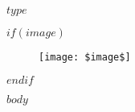 \documentclass{article}
\begin{document}
  \begin{flushright}
    {$type$}
  \end{flushright}
  $if(image)$
  \begin{figure}[H]
      \centering
      \texttt{[image: \$image\$]}
  \end{figure}
  $endif$
  \begin{flushleft}
    \scriptsize{$body$}
  \end{flushleft}
  \scriptsize
\end{document}
